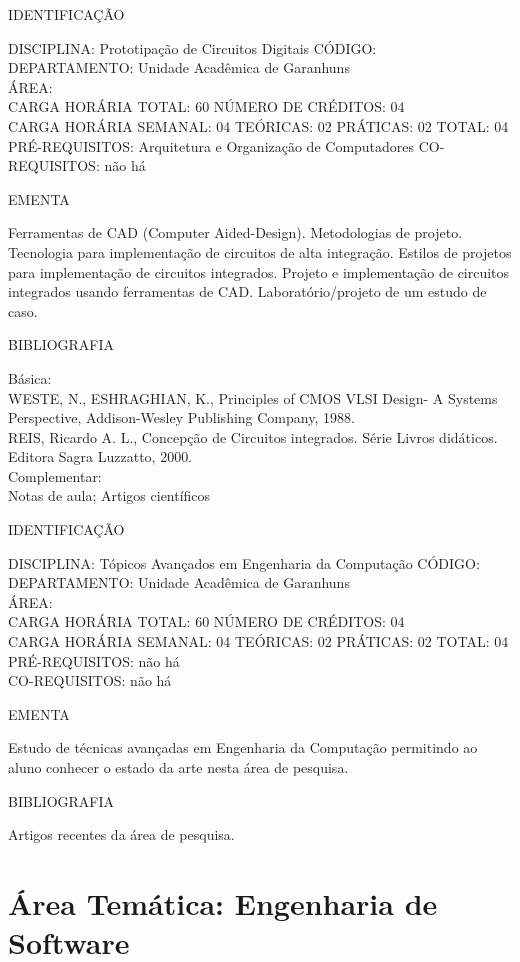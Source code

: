 \documentclass[
	12pt,				%
	openright,			%
  oneside,     %
	a4paper,			%
	chapter=TITLE,		%
	english,			%
	french,				%
	spanish,			%
	brazil				%
	]{abntex2}
\begin{document}
\begin{apendicesenv}
\newpage IDENTIFICAÇÃO

DISCIPLINA: Prototipação de Circuitos Digitais CÓDIGO:\\ 
DEPARTAMENTO: Unidade Acadêmica de Garanhuns\\
ÁREA: \\
CARGA HORÁRIA TOTAL: 60 NÚMERO DE CRÉDITOS: 04\\
CARGA HORÁRIA SEMANAL: 04 TEÓRICAS: 02 PRÁTICAS: 02 TOTAL: 04\\
PRÉ-REQUISITOS: Arquitetura e Organização de Computadores
CO-REQUISITOS: não há

EMENTA 

Ferramentas de CAD (Computer Aided-Design). Metodologias de projeto.
Tecnologia para implementação de circuitos de alta integração. Estilos
de projetos para implementação de circuitos integrados. Projeto e
implementação de circuitos integrados usando ferramentas de CAD.
Laboratório/projeto de um estudo de caso.

BIBLIOGRAFIA 

Básica:\\
WESTE, N., ESHRAGHIAN, K., Principles of CMOS VLSI Design- A Systems
Perspective, Addison-Wesley Publishing Company, 1988.\\
REIS, Ricardo A. L., Concepção de Circuitos integrados. Série Livros
didáticos. Editora Sagra Luzzatto, 2000.\\
Complementar:\\
Notas de aula; Artigos científicos

\newpage IDENTIFICAÇÃO

DISCIPLINA: Tópicos Avançados em Engenharia da Computação CÓDIGO:\\ 
DEPARTAMENTO: Unidade Acadêmica de Garanhuns\\ 
ÁREA:\\
CARGA HORÁRIA TOTAL: 60 NÚMERO DE CRÉDITOS: 04\\
CARGA HORÁRIA SEMANAL: 04 TEÓRICAS: 02 PRÁTICAS: 02 TOTAL: 04\\
PRÉ-REQUISITOS: não há\\
CO-REQUISITOS: não há

EMENTA 

Estudo de técnicas avançadas em Engenharia da Computação permitindo ao
aluno conhecer o estado da arte nesta área de pesquisa.

BIBLIOGRAFIA 

Artigos recentes da área de pesquisa.
\newpage 

\section*{Área Temática: Engenharia de Software}


\end{apendicesenv}
\end{document}
